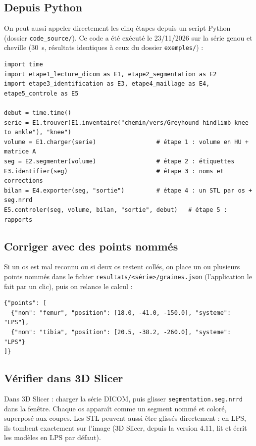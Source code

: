 \documentclass[11pt,a4paper]{article}
\newcommand{\fichier}[1]{\texttt{\small #1}}
\begin{document}
\subsection{Depuis Python}

On peut aussi appeler directement les cinq étapes depuis un script Python (dossier \fichier{code\_source/}). Ce code
a été exécuté le 23/11/2026 sur la série genou et cheville (30~s, résultats identiques à ceux du dossier
\fichier{exemples/}) :

\begin{Verbatim}
import time
import etape1_lecture_dicom as E1, etape2_segmentation as E2
import etape3_identification as E3, etape4_maillage as E4, etape5_controle as E5

debut = time.time()
serie = E1.trouver(E1.inventaire("chemin/vers/Greyhound hindlimb knee to ankle"), "knee")
volume = E1.charger(serie)                 # étape 1 : volume en HU + matrice A
seg = E2.segmenter(volume)                 # étape 2 : étiquettes
E3.identifier(seg)                         # étape 3 : noms et corrections
bilan = E4.exporter(seg, "sortie")         # étape 4 : un STL par os + seg.nrrd
E5.controler(seg, volume, bilan, "sortie", debut)   # étape 5 : rapports
\end{Verbatim}

\subsection{Corriger avec des points nommés}
\label{sec-graines-json}

Si un os est mal reconnu ou si deux os restent collés, on place un ou plusieurs points nommés dans le fichier
\fichier{resultats/<série>/graines.json} (l'application le fait par un clic), puis on relance le calcul :

\begin{Verbatim}
{"points": [
  {"nom": "femur", "position": [18.0, -41.0, -150.0], "systeme": "LPS"},
  {"nom": "tibia", "position": [20.5, -38.2, -260.0], "systeme": "LPS"}
]}
\end{Verbatim}

\subsection{Vérifier dans 3D Slicer}

Dans 3D Slicer : charger la série DICOM, puis glisser \fichier{segmentation.seg.nrrd} dans la fenêtre. Chaque os
apparaît comme un segment nommé et coloré, superposé aux coupes. Les STL peuvent aussi être glissés directement : en
LPS, ils tombent exactement sur l'image (3D Slicer, depuis la version 4.11, lit et écrit les modèles en LPS par
défaut).
\end{document}
